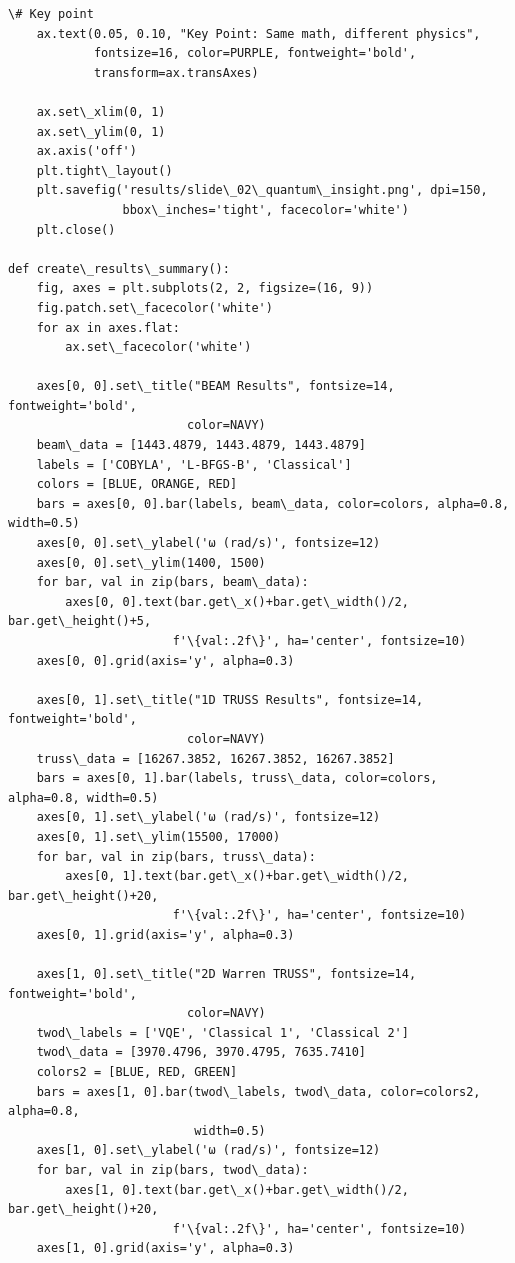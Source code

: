 \documentclass[12pt, a4paper]{article}
\begin{document}
\begin{lstlisting}[style=codestyle, caption={{generate_presentation.py --- Slide Generator}}]
    \# Key point
    ax.text(0.05, 0.10, "Key Point: Same math, different physics",
            fontsize=16, color=PURPLE, fontweight='bold',
            transform=ax.transAxes)

    ax.set\_xlim(0, 1)
    ax.set\_ylim(0, 1)
    ax.axis('off')
    plt.tight\_layout()
    plt.savefig('results/slide\_02\_quantum\_insight.png', dpi=150,
                bbox\_inches='tight', facecolor='white')
    plt.close()

def create\_results\_summary():
    fig, axes = plt.subplots(2, 2, figsize=(16, 9))
    fig.patch.set\_facecolor('white')
    for ax in axes.flat:
        ax.set\_facecolor('white')

    axes[0, 0].set\_title("BEAM Results", fontsize=14, fontweight='bold',
                         color=NAVY)
    beam\_data = [1443.4879, 1443.4879, 1443.4879]
    labels = ['COBYLA', 'L-BFGS-B', 'Classical']
    colors = [BLUE, ORANGE, RED]
    bars = axes[0, 0].bar(labels, beam\_data, color=colors, alpha=0.8, width=0.5)
    axes[0, 0].set\_ylabel('ω (rad/s)', fontsize=12)
    axes[0, 0].set\_ylim(1400, 1500)
    for bar, val in zip(bars, beam\_data):
        axes[0, 0].text(bar.get\_x()+bar.get\_width()/2, bar.get\_height()+5,
                       f'\{val:.2f\}', ha='center', fontsize=10)
    axes[0, 0].grid(axis='y', alpha=0.3)

    axes[0, 1].set\_title("1D TRUSS Results", fontsize=14, fontweight='bold',
                         color=NAVY)
    truss\_data = [16267.3852, 16267.3852, 16267.3852]
    bars = axes[0, 1].bar(labels, truss\_data, color=colors, alpha=0.8, width=0.5)
    axes[0, 1].set\_ylabel('ω (rad/s)', fontsize=12)
    axes[0, 1].set\_ylim(15500, 17000)
    for bar, val in zip(bars, truss\_data):
        axes[0, 1].text(bar.get\_x()+bar.get\_width()/2, bar.get\_height()+20,
                       f'\{val:.2f\}', ha='center', fontsize=10)
    axes[0, 1].grid(axis='y', alpha=0.3)

    axes[1, 0].set\_title("2D Warren TRUSS", fontsize=14, fontweight='bold',
                         color=NAVY)
    twod\_labels = ['VQE', 'Classical 1', 'Classical 2']
    twod\_data = [3970.4796, 3970.4795, 7635.7410]
    colors2 = [BLUE, RED, GREEN]
    bars = axes[1, 0].bar(twod\_labels, twod\_data, color=colors2, alpha=0.8,
                          width=0.5)
    axes[1, 0].set\_ylabel('ω (rad/s)', fontsize=12)
    for bar, val in zip(bars, twod\_data):
        axes[1, 0].text(bar.get\_x()+bar.get\_width()/2, bar.get\_height()+20,
                       f'\{val:.2f\}', ha='center', fontsize=10)
    axes[1, 0].grid(axis='y', alpha=0.3)


\end{lstlisting}
\end{document}
